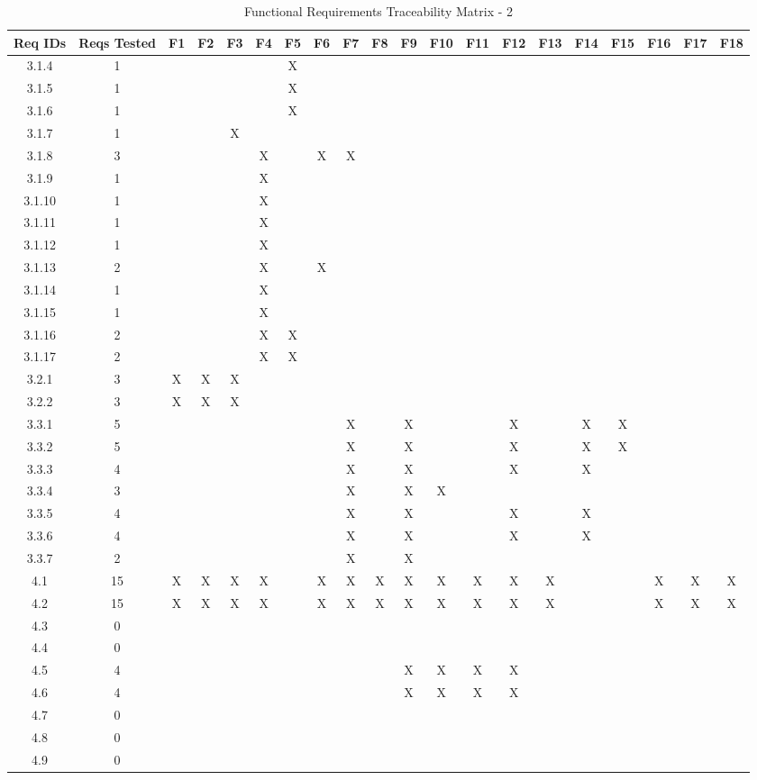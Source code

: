 \documentclass[titlepage]{article}
\begin{document}
\begin{center}
\begin{table}[h!]
\hspace*{-7.5mm}
\begin{tabular}{|c|c|c|c|c |c|c|c|c|c |c|c|c|c|c |c|c|c|c|c|}\hline
\multicolumn{1}{|C{1.5}|}{Req IDs}	&\multicolumn{1}{|C{1}|}{Reqs Tested}	&F1	&F2	&F3	&F4	&F5	&F6	&F7	&F8	&F9	&F10	&F11	&F12	&F13	&F14	&F15	&F16	&F17	&F18\\\hline
3.1.4 &1&&& &&X&&& &&&&& &&&&&\\\hline
3.1.5 &1&&& &&X&&& &&&&& &&&&&\\\hline
3.1.6 &1&&& &&X&&& &&&&& &&&&&\\\hline
3.1.7 &1&&&X &&&&& &&&&& &&&&&\\\hline
3.1.8 &3&&& &X&&X&X& &&&&& &&&&&\\\hline
3.1.9 &1&&& &X&&&& &&&&& &&&&&\\\hline
3.1.10 &1&&& &X&&&& &&&&& &&&&&\\\hline
3.1.11 &1&&& &X&&&& &&&&& &&&&&\\\hline
3.1.12 &1&&& &X&&&& &&&&& &&&&&\\\hline
3.1.13 &2&&& &X&&X&& &&&&& &&&&&\\\hline
3.1.14 &1&&& &X&&&& &&&&& &&&&&\\\hline
3.1.15 &1&&& &X&&&& &&&&& &&&&&\\\hline
3.1.16 &2&&& &X&X&&& &&&&& &&&&&\\\hline
3.1.17 &2&&& &X&X&&& &&&&& &&&&&\\\hline
3.2.1 &3&X&X&X &&&&& &&&&& &&&&&\\\hline
3.2.2 &3&X&X&X &&&&& &&&&& &&&&&\\\hline
3.3.1 &5&&& &&&&X& &X&&&X& &X&X&&&\\\hline
3.3.2 &5&&& &&&&X& &X&&&X& &X&X&&&\\\hline
3.3.3 &4&&& &&&&X& &X&&&X& &X&&&&\\\hline
3.3.4 &3&&& &&&&X& &X&X&&& &&&&&\\\hline
3.3.5 &4&&& &&&&X& &X&&&X& &X&&&&\\\hline
3.3.6 &4&&& &&&&X& &X&&&X& &X&&&&\\\hline
3.3.7 &2&&& &&&&X& &X&&&& &&&&&\\\hline
4.1 &15&X&X&X &X&&X&X&X &X&X&X&X&X &&&X&X&X\\\hline
4.2 &15&X&X&X &X&&X&X&X &X&X&X&X&X &&&X&X&X\\\hline
4.3 &0&&& &&&&& &&&&& &&&&&\\\hline
4.4 &0&&& &&&&& &&&&& &&&&&\\\hline
4.5 &4&&& &&&&& &X&X&X&X& &&&&&\\\hline
4.6 &4&&& &&&&& &X&X&X&X& &&&&&\\\hline
4.7 &0&&& &&&&& &&&&& &&&&&\\\hline
4.8 &0&&& &&&&& &&&&& &&&&&\\\hline
4.9 &0&&& &&&&& &&&&& &&&&&\\\hline
\end{tabular}
\caption{Functional Requirements Traceability Matrix - 2}
\end{table}
\end{center}
\newpage~
\newpage~
\end{document}
